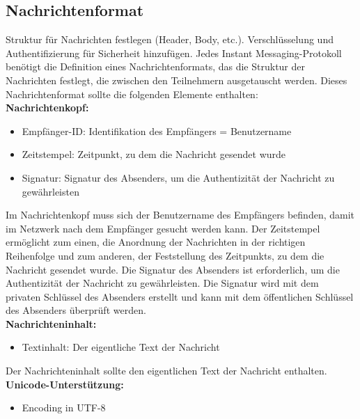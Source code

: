 \subsection{Nachrichtenformat}

Struktur für Nachrichten festlegen (Header, Body, etc.).
Verschlüsselung und Authentifizierung für Sicherheit hinzufügen.
Jedes Instant Messaging-Protokoll benötigt die Definition eines Nachrichtenformats,
das die Struktur der Nachrichten festlegt, die zwischen den Teilnehmern ausgetauscht werden.
Dieses Nachrichtenformat sollte die folgenden Elemente enthalten:
\\

\noindent \textbf{Nachrichtenkopf:}
\begin{itemize}
    \item Empfänger-ID: Identifikation des Empfängers = Benutzername
    \item Zeitstempel: Zeitpunkt, zu dem die Nachricht gesendet wurde
    \item Signatur: Signatur des Absenders, um die Authentizität der Nachricht zu gewährleisten
\end{itemize}

\noindent Im Nachrichtenkopf muss sich der Benutzername des Empfängers befinden, damit im Netzwerk nach dem Empfänger gesucht werden kann. Der Zeitstempel ermöglicht zum einen, die Anordnung der Nachrichten in der richtigen Reihenfolge und zum anderen, der Feststellung des Zeitpunkts, zu dem die Nachricht gesendet wurde. Die Signatur des Absenders ist erforderlich, um die Authentizität der Nachricht zu gewährleisten. Die Signatur wird mit dem privaten Schlüssel des Absenders erstellt und kann mit dem öffentlichen Schlüssel des Absenders überprüft werden.
\\


\noindent \textbf{Nachrichteninhalt:}
\begin{itemize}
    \item Textinhalt: Der eigentliche Text der Nachricht
\end{itemize}

\noindent Der Nachrichteninhalt sollte den eigentlichen Text der Nachricht enthalten. 
\\


\noindent \textbf{Unicode-Unterstützung:}
\begin{itemize}
    \item Encoding in UTF-8
\end{itemize}

